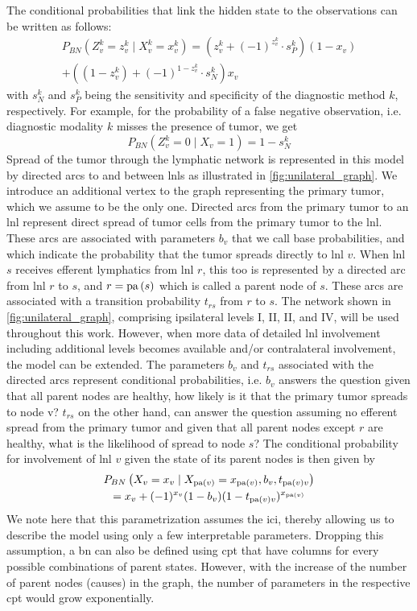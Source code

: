 \documentclass[../ms.tex]{subfiles}
\begin{document}
The conditional probabilities that link the hidden state to the observations can be written as follows:
%
\begin{multline}
    P_{BN} \left( Z_v^k = z_v^k \mid X_v^k = x_v^k \right) = \left( z_v^k + (-1)^{z_v^k} \cdot s_P^k \right)(1 - x_v) \\ 
    + \left( (1 - z_v^k) + (-1)^{1 - z_v^k} \cdot s_N^k \right) x_v
\end{multline}
%
with $s_N^k$ and $s_P^k$ being the sensitivity and specificity of the diagnostic method $k$, respectively. For example, for the probability of a false negative observation, i.e. diagnostic modality $k$ misses the presence of tumor, we get
%
\begin{equation}
    P_{BN} \left( Z_v^k = 0 \mid X_v = 1 \right) = 1 - s_N^k
\end{equation}
%
Spread of the tumor through the lymphatic network is represented in this model by directed arcs to and between \glspl{lnl} as illustrated in \cref{fig:unilateral_graph}. We introduce an additional vertex to the graph representing the primary tumor, which we assume to be the only one. Directed arcs from the primary tumor to an \gls{lnl} represent direct spread of tumor cells from the primary tumor to the \gls{lnl}. These arcs are associated with parameters $b_v$ that we call base probabilities, and which indicate the probability that the tumor spreads directly to \gls{lnl} $v$. When \gls{lnl} $s$ receives efferent lymphatics from \gls{lnl} $r$, this too is represented by a directed arc from \gls{lnl} $r$ to $s$, and $r=\operatorname{pa}{(s)}$ which is called a parent node of $s$. These arcs are associated with a transition probability $t_{rs}$ from $r$ to $s$. The network shown in \cref{fig:unilateral_graph}, comprising ipsilateral levels I, II, II, and IV, will be used throughout this work. However, when more data of detailed \gls{lnl} involvement including additional levels becomes available and/or contralateral involvement, the model can be extended.
The parameters $b_v$ and $t_{rs}$   associated with the directed arcs represent conditional probabilities, i.e. $b_v$ answers the question given that all parent nodes are healthy, how likely is it that the primary tumor spreads to node v? $t_{rs}$   on the other hand, can answer the question assuming no efferent spread from the primary tumor and given that all parent nodes except $r$ are healthy, what is the likelihood of spread to node $s$? The conditional probability for involvement of \gls{lnl} $v$ given the state of its parent nodes is then given by
%
\begin{multline}
    P_{BN} \left( X_v = x_v \mid X_{\operatorname{pa}(v)} = x_{\operatorname{pa}(v)}, b_v, t_{\operatorname{pa}(v)v} \right) \\
    = x_v + (-1)^{x_v} (1 - b_v) (1 - t_{\operatorname{pa}(v)v})^{x_{\operatorname{pa}(v)}}
\end{multline}
%
We note here that this parametrization assumes the \gls{ici}, thereby allowing us to describe the model using only a few interpretable parameters. Dropping this assumption, a \gls{bn} can also be defined using \gls{cpt} that have columns for every possible combinations of parent states. However, with the increase of the number of parent nodes (causes) in the graph, the number of parameters in the respective \gls{cpt} would grow exponentially.
\end{document}
